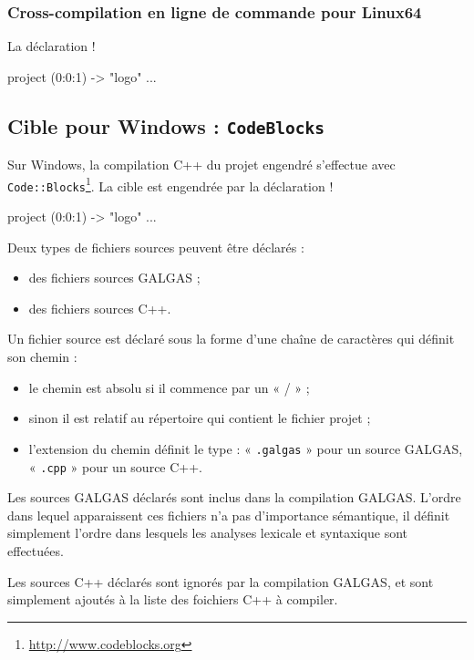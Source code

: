 \subsubsection{Cross-compilation en ligne de commande pour Linux64}

La déclaration \ggs!%

\begin{galgas}
project (0:0:1) -> "logo" {
  ...
}
\end{galgas}



\subsection{Cible pour Windows : \texttt{CodeBlocks}}

Sur Windows, la compilation C++ du projet engendré s'effectue avec \texttt{Code::Blocks}\footnote{\url{http://www.codeblocks.org}}. La cible est engendrée par la déclaration \ggs!%

\begin{galgas}
project (0:0:1) -> "logo" {
  ...
}
\end{galgas}






Deux types de fichiers sources peuvent être déclarés :
\begin{itemize}
  \item des fichiers sources GALGAS ;
  \item des fichiers sources C++.
\end{itemize}

Un fichier source est déclaré sous la forme d'une chaîne de caractères qui définit son chemin :
\begin{itemize}
\item le chemin est absolu si il commence par un « / » ;
\item sinon il est relatif au répertoire qui contient le fichier projet ;
\item l'extension du chemin définit le type : « \texttt{.galgas} » pour un source GALGAS, « \texttt{.cpp} » pour un source C++.
\end{itemize}

Les sources GALGAS déclarés sont inclus dans la compilation GALGAS. L'ordre dans lequel apparaissent ces fichiers n'a pas d'importance sémantique, il définit simplement l'ordre dans lesquels les analyses lexicale et syntaxique sont effectuées.

Les sources C++ déclarés sont ignorés par la compilation GALGAS, et sont simplement ajoutés à la liste des foichiers C++ à compiler.




